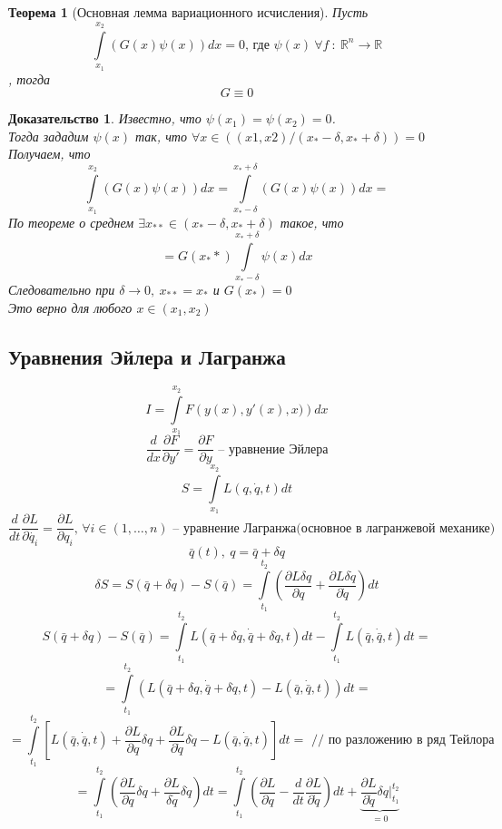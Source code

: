 \documentclass[a4paper, 12pt, titlepage, fleqn]{article}
\newtheorem{Proof}{Доказательство}
\newtheorem{Th}{Теорема}
\newcommand{\Real}{\mathbb{R}}
\newcommand{\T}{\textbf}
\newcommand{\D}{\partial}
\newcommand{\Where}{\T{, где }}
\newcommand{\Indexes}{\T{, }\forall i \in (1, \dots, n)}
\begin{document}
			\begin{Th}[Основная лемма вариационного исчисления]
				Пусть
				\[
					\int\limits_{x_1}^{x_2} \left(G\left(x\right) \psi \left(x\right) \right) dx = 0 \Where \psi(x) \: \forall f \: \colon \: \Real^n \to \Real
				\]
				, тогда
				\[
					G \equiv 0
				\] 
			\end{Th}
			\begin{Proof}
				Известно, что $\psi(x_1) = \psi(x_2) = 0$.\\
				Тогда зададим $\psi(x)$ так, что $\forall x \in \left((x1, x2) / (x_* - \delta, x_* + \delta)\right) = 0$\\	
				Получаем, что 
				\[
					\int\limits_{x_1}^{x_2} \left(G(x) \psi(x)\right) dx = \int\limits_{x_* - \delta}^{x_* + \delta} \left(G(x) \psi(x)\right) dx =
				\]
				По теореме о среднем $\exists x_{**} \in (x_* - \delta, x_* + \delta)$ такое, что
				\[
					= G(x_**) \int\limits_{x_* - \delta}^{x_* + \delta} \psi(x)dx				
				\]
				Следовательно при $\delta \to 0 ,\: x_{**} = x_*$ и $G(x_*) = 0$\\
				Это верно для любого $x \in (x_1, x_2)$
			\end{Proof}
		\subsection{Уравнения Эйлера и Лагранжа}
			\[
				I = \int\limits_{x_1}^{x_2} F\left(y(x), y'(x), x) \right)dx
			\]
			\[
				\frac{d}{dx}\frac{\D F}{\D y'} = \frac{\D F}{\D y} \T{ -- уравнение Эйлера}
			\]
			\[
				S = \int\limits_{x_1}^{x_2} L\left(q, \dot{q}, t\right)dt
			\]
			\[
				\frac{d}{dt}\frac{\D L}{\D \dot{q_i}} = \frac{\D L}{\D q_i} \Indexes \T{ -- уравнение Лагранжа(основное в лагранжевой механике)}
			\]
			\[
				\bar{q}(t), \: q = \bar{q} + \delta q 
			\]
			\[
				\delta S = S\left(\bar{q} + \delta q\right) - S(\bar{q}) = \int\limits_{t_1}^{t_2} \left(\frac{\D L \delta q}{\D q} + \frac{\D L \delta \dot{q}}{\D \dot{q}}\right) dt
			\]
			\[
				S(\bar{q} + \delta q) - S(\bar{q}) = \int\limits_{t_1}^{t_2} L(\bar{q} + \delta q, \dot{\bar{q}} + \delta \dot{q}, t)dt - \int\limits_{t_1}^{t_2} L(\bar{q}, \dot{\bar{q}}, t)dt =
			\]
			\[
				= \int \limits_{t_1}^{t_2} \left(L(\bar{q} + \delta q, \dot{\bar{q}} + \delta \dot{q}, t) - L(\bar{q}, \dot{\bar{q}}, t)\right)dt = 
			\]
			\[
				= \int \limits_{t_1}^{t_2} \left[L(\bar{q}, \dot{\bar{q}}, t) + \frac{\D L}{\D q} \delta q + \frac{\D L}{\D \dot{q}} \delta\dot{q} - L(\bar{q}, \dot{\bar{q}}, t)\right]dt = \T{ // по разложению в ряд Тейлора}
			\]
			\[
				= \int \limits_{t_1}^{t_2} \left(\frac{\D L}{\D q}\delta q + \frac{\D L}{\delta\dot{q}}\delta\dot{q}\right)dt = \int \limits_{t_1}^{t_2} \left(\frac{\D L}{\D q} - \frac{d}{dt}\frac{\D L}{\D \dot{q}} \right)dt + \underbrace{\frac{\D L}{\D \dot{q}}\delta q |_{t_1}^{t_2}}_{=0}
			\]
\end{document}
